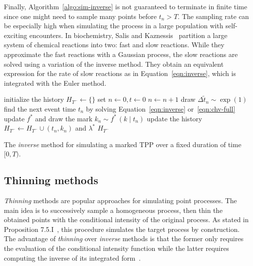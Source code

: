 \documentclass{juliacon}
\numberwithin{equation}{section}
\begin{document}
Finally, Algorithm~\ref{algo:sim-inverse} is not guaranteed to terminate in finite time since one might need to sample many points before \( t_n > T \). The sampling rate can be especially high when simulating the process in a large population with self-exciting encounters. In biochemistry, Salis and Kaznessis~\cite{salis2005} partition a large system of chemical reactions into two: fast and slow reactions. While they approximate the fast reactions with a Gaussian process, the slow reactions are solved using a variation of the inverse method. They obtain an equivalent expression for the rate of slow reactions as in Equation~\ref{eqn:inverse}, which is integrated with the Euler method.

\begin{algorithm}[h]
\begin{algorithmic}[1]
  \Procedure{InverseMethod}{\( [0, T) \), \( \lambda^\ast \), \( f^\ast \),}
    \State initialize the history \( H_{T^-} \leftarrow \{ \} \)
    \State set \( n \leftarrow 0, t \leftarrow  0 \)
      \State \( n \leftarrow n + 1 \)
      \State draw \( \Delta \tilde{t}_n \sim \exp(1) \)
      \State find the next event time \( t_n \) by solving Equation~\ref{eqn:inverse} or~\ref{eqn:chv-full}
      \State update \( f^\ast \) and draw the mark \( k_n \sim f^\ast \, (k \mid t_n) \) \label{line:inverse-mark-sample}
      \State update the history \( H_{T^-} \leftarrow H_{T^-} \cup (t_n, k_n) \) and \( \lambda^\ast \) \label{line:inverse-history-update}
    \EndWhile
    \State \Return \( H_{T^-} \)
  \EndProcedure
\end{algorithmic}
\caption{The \textit{inverse} method for simulating a marked TPP over a fixed duration of time \( [0, T) \).}
\label{algo:sim-inverse}
\end{algorithm}

\subsection{Thinning methods} \label{subsec:sim-thinning}

\textit{Thinning} methods are popular approaches for simulating point processes. The main idea is to successively sample a homogeneous process, then thin the obtained points with the conditional intensity of the original process. As stated in Proposition 7.5.I~\cite{daley2003}, this procedure simulates the target process by construction. The advantage of \textit{thinning} over \textit{inverse} methods is that the former only requires the evaluation of the conditional intensity function while the latter requires computing the inverse of its integrated form~\cite{daley2003}.
\end{document}
